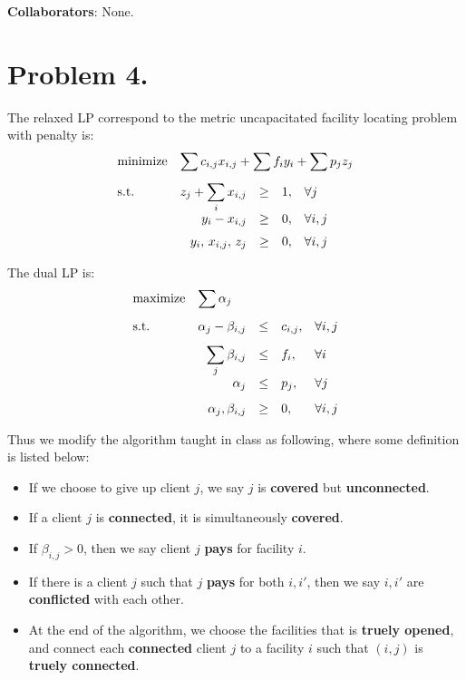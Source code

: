 \documentclass[12pt, a4paper]{article}
\begin{document}
{\bf Collaborators}: None.

\section{Problem 4.}
The relaxed LP correspond to the metric uncapacitated facility locating problem with penalty is:
\begin{equation} \label{eq:facil-lp}
  \begin{array}{>{\displaystyle}l>{\displaystyle}r>{\displaystyle}c*2{>{\displaystyle}l}}
    \text{minimize} & \multicolumn{4}{l}{\displaystyle \sum c_{i,j} x_{i,j} + \sum f_i y_i + \sum p_j z_j} \\[10pt]
    \text{s.t.} & z_j + \sum_i x_{i, j} & \geq & 1, & \forall j \\
    & y_i - x_{i, j} & \geq & 0, & \forall i, j \\[6pt]
    & y_i,\, x_{i, j},\, z_j & \geq & 0, & \forall i, j
  \end{array}
\end{equation}

The dual LP is:
\begin{equation} \label{eq:facil-dual-lp}
  \begin{array}{>{\displaystyle}l>{\displaystyle}r>{\displaystyle}c*2{>{\displaystyle}l}}
    \text{maximize} & \multicolumn{4}{l}{\displaystyle \sum \alpha_j} \\[10pt]
    \text{s.t.} & \alpha_j - \beta_{i, j} & \leq & c_{i, j}, & \forall i, j \\[8pt]
    & \sum_j \beta_{i,j} & \leq & f_i, & \forall i \\
    & \alpha_j & \leq & p_j, & \forall j \\[8pt]
    & \alpha_j, \beta_{i, j} & \geq & 0, & \forall i, j
  \end{array}
\end{equation}

Thus we modify the algorithm taught in class as following, where some definition is listed below:
\begin{itemize}
  \item If we choose to give up client $j$, we say $j$ is {\bf covered} but {\bf unconnected}.
  \item If a client $j$ is {\bf connected}, it is simultaneously {\bf covered}.
  \item If $\beta_{i, j} > 0$, then we say client $j$ {\bf pays} for facility $i$.
  \item If there is a client $j$ such that $j$ {\bf pays} for both $i, i'$, then we say
    $i, i'$ are {\bf conflicted} with each other.
  \item At the end of the algorithm, we choose the facilities that is {\bf truely opened},
    and connect each {\bf connected} client $j$ to a facility $i$ such that $(i, j)$ is {\bf truely connected}.
\end{itemize}
\end{document}
